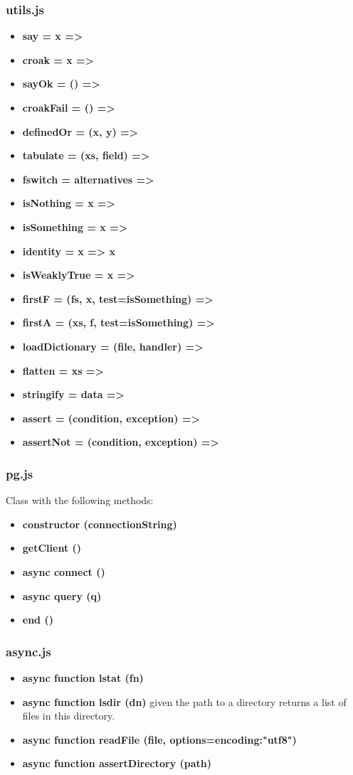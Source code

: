 \documentclass[a4paper,11pt]{report}
\newcommand{\cs}[1]{{\bfseries \ttfamily #1}}
\begin{document}
\subsubsection{utils.js}
\begin{itemize}
\item\cs{say = x =>}
\item\cs{croak = x =>}
\item\cs{sayOk = () =>}
\item\cs{croakFail = () =>}
\item\cs{definedOr = (x, y) =>}
\item\cs{tabulate = (xs, field) =>}
\item\cs{fswitch = alternatives =>}
\item\cs{isNothing = x =>}
\item\cs{isSomething = x =>}
\item\cs{identity = x => x}
\item\cs{isWeaklyTrue = x =>}
\item\cs{firstF = (fs, x, test=isSomething) =>}
\item\cs{firstA = (xs, f, test=isSomething) =>}
\item\cs{loadDictionary = (file, handler) =>}
\item\cs{flatten = xs =>}
\item\cs{stringify = data =>}
\item\cs{assert = (condition, exception) =>}
\item\cs{assertNot = (condition, exception) =>}
\end{itemize}
\subsubsection{pg.js}
Class with the following methods:
\begin{itemize}
\item\cs{constructor (connectionString)}
\item\cs{getClient ()}
\item\cs{async connect ()}
\item\cs{async query (q)}
\item\cs{end ()}
\end{itemize}
\subsubsection{async.js}
\begin{itemize}
\item \cs{async function lstat (fn)}
\item \cs{async function lsdir (dn)} given the path to a directory returns a list of files in this directory.
\item \cs{async function readFile (file, options={encoding:"utf8"})}
\item \cs{async function assertDirectory (path)}
\end{itemize}
\end{document}
